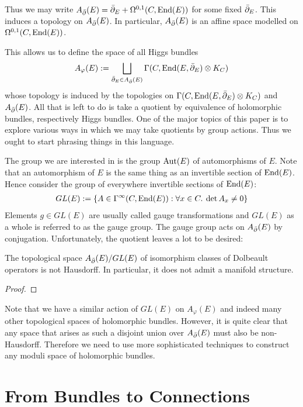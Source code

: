 \documentclass[12pt]{ociamthesis}  %
\begin{document}
Thus we may write $A_{\bar{\partial}} (E) = {\bar{\partial}}_E + \Omega^{0,1}(C,\operatorname{End}(E))$
for some fixed ${\bar{\partial}}_E$. This induces a topology on $A_{\bar{\partial}} (E)$.
In particular, $A_{\bar{\partial}} (E)$ is an affine space modelled on
$\Omega^{0,1}(C,\operatorname{End}(E))$.

This allows us to define the space of all Higgs bundles
\begin{align*}
  A_\varphi(E) := \bigsqcup_{{\bar{\partial}}_E \in A_{\bar{\partial}} (E)} \Gamma(C,\operatorname{End}(E,{\bar{\partial}}_E)\otimes K_C)
\end{align*}
whose topology is induced by the topologies on
$\Gamma(C,\operatorname{End}(E,{\bar{\partial}}_E)\otimes K_C)$ and $A_{\bar{\partial}} (E)$.
All that is left to do is take a quotient by equivalence of holomorphic
bundles, respectively Higgs bundles. One of the major topics of this
paper is to explore various ways in which we may take quotients by
group actions. Thus we ought to start phrasing things in this language.

The group we are interested in is the group $\operatorname{Aut}(E)$ of automorphisms
of $E$. Note that an automorphism of $E$ is the same thing as
an invertible section of $\operatorname{End}(E)$. Hence consider the group
of everywhere invertible sections of $\operatorname{End}(E)$:
\begin{align*}
  GL(E) := \{A \in \Gamma^\infty(C,\operatorname{End}(E)) : \forall x \in C.\:\det A_x \neq 0\}
\end{align*}
Elements $g\in GL(E)$ are usually called gauge transformations and
$GL(E)$ as a whole is referred to as the gauge group.
The gauge group acts on $A_{\bar{\partial}}(E)$ by conjugation.
Unfortunately, the quotient leaves a lot to be desired:
\begin{lemma}
  The topological space $A_{\bar{\partial}} (E)/GL(E)$ of isomorphism classes of
  Dolbeault operators is not Hausdorff. In particular, it does not
  admit a manifold structure.
  \begin{proof}
    \missingproof
  \end{proof}
\end{lemma}

Note that we have a similar action of $GL(E)$ on $A_\varphi(E)$ and
indeed many other topological spaces of holomorphic bundles. However,
it is quite clear that any space that arises as such a disjoint union
over $A_{\bar{\partial}} (E)$ must also be non-Hausdorff. Therefore we need
to use more sophisticated techniques to construct any moduli
space of holomorphic bundles.

\section{From Bundles to Connections}
\end{document}
